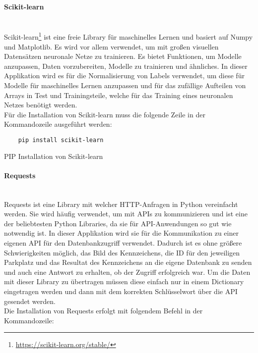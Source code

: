 \paragraph{Scikit-learn}\mbox{}\\
Scikit-learn\footnote{\url{https://scikit-learn.org/stable/}} ist eine freie Library für maschinelles Lernen und basiert auf Numpy und Matplotlib. Es wird vor allem verwendet, 
um mit großen visuellen Datensätzen neuronale Netze zu trainieren.  Es bietet Funktionen, um Modelle anzupassen, Daten vorzubereiten, 
Modelle zu trainieren und ähnliches. In dieser Applikation wird es für die Normalisierung von Labels verwendet, um diese für Modelle für maschinelles Lernen anzupassen und für das zufällige Aufteilen von Arrays in Test und Trainingsteile, welche für das Training eines neuronalen Netzes benötigt werden.\\

Für die Installation von Scikit-learn muss die folgende Zeile in der Kommandozeile ausgeführt werden:

\begin{listing}[H]
    \begin{verbatim}
    pip install scikit-learn
    \end{verbatim}
    \caption{PIP Installation von Scikit-learn}
\end{listing}

\paragraph{Requests}\mbox{}\\
Requests ist eine Library mit welcher HTTP-Anfragen in Python vereinfacht werden. Sie wird häufig verwendet, um mit APIs zu kommunizieren 
und ist eine der beliebtesten Python Libraries, da sie für API-Anwendungen so gut wie notwendig ist. In dieser Applikation wird sie für die 
Kommunikation zu einer eigenen API für den Datenbankzugriff verwendet. Dadurch ist es ohne größere Schwierigkeiten möglich, das Bild des Kennzeichens, 
die ID für den jeweiligen Parkplatz und das Resultat des Kennzeichens an die eigene Datenbank zu senden und auch eine Antwort zu erhalten, ob der 
Zugriff erfolgreich war. Um die Daten mit dieser Library zu übertragen müssen diese einfach nur in einem Dictionary eingetragen werden und dann mit 
dem korrekten Schlüsselwort über die API gesendet werden.\\

Die Installation von Requests erfolgt mit folgendem Befehl in der Kommandozeile:

